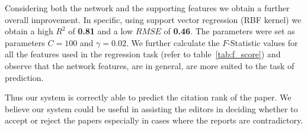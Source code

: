  Considering both the network and the supporting features we obtain a further overall improvement. In specific, using support vector regression (RBF kernel) we obtain a high $R^2$ of {\bf 0.81} and a low $RMSE$ of {\bf 0.46}. The parameters were set as parameters $C=100$ and $\gamma=0.02$. We further calculate the $F$-Statistic values for all the features used in the regression task (refer to table~\ref{tab:f_score}) and observe that the network features, are in general, are more suited to the task of prediction.


Thus our system is correctly able to predict the citation rank of the paper. We believe our system could be useful in assisting the editors in deciding whether to accept or reject the papers especially in cases where the reports are contradictory. 
\medskip